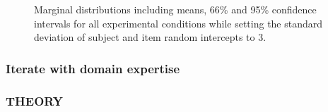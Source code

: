 \documentclass[
  man,
  floatsintext,
  longtable,
  a4paper,
  nolmodern,
  notxfonts,
  notimes,
  colorlinks=true,linkcolor=blue,citecolor=blue,urlcolor=blue]{apa7}
\begin{document}
\label{cell-fig-margdist3}
\begin{figure}[H]

\caption{\label{fig-margdist3}Marginal distributions including means,
66\% and 95\% confidence intervals for all experimental conditions while
setting the standard deviation of subject and item random intercepts to
3.}


\end{figure}%

\subsubsection{Iterate with domain
expertise}\label{iterate-with-domain-expertise}

\subsubsection{THEORY}\label{theory-5}
\end{document}

